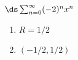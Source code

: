 {$\ds\sum_{n=0}^\infty (-2)^nx^{n}$
}
{\begin{enumerate}
	\item $R=1/2$
	\item	$(-1/2,1/2)$
\end{enumerate}
}